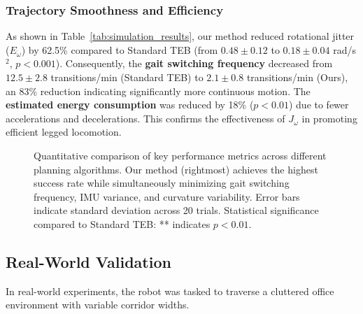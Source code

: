 \documentclass[lettersize,journal]{IEEEtran}
\begin{document}
\subsubsection{Trajectory Smoothness and Efficiency}
As shown in Table~\ref{tab:simulation_results}, our method reduced rotational jitter ($E_{\dot{\omega}}$) by 62.5\% compared to Standard TEB (from $0.48 \pm 0.12$ to $0.18 \pm 0.04$ rad/s$^2$, $p < 0.001$). Consequently, the \textbf{gait switching frequency} decreased from $12.5 \pm 2.8$ transitions/min (Standard TEB) to $2.1 \pm 0.8$ transitions/min (Ours), an 83\% reduction indicating significantly more continuous motion. The \textbf{estimated energy consumption} was reduced by 18\% ($p < 0.01$) due to fewer accelerations and decelerations. This confirms the effectiveness of $J_{\dot{\omega}}$ in promoting efficient legged locomotion.

\begin{figure}[!t]
\centering
\caption{Quantitative comparison of key performance metrics across different planning algorithms. Our method (rightmost) achieves the highest success rate while simultaneously minimizing gait switching frequency, IMU variance, and curvature variability. Error bars indicate standard deviation across 20 trials. Statistical significance compared to Standard TEB: ** indicates $p < 0.01$.}
\label{fig:bar_chart}
\end{figure}

\subsection{Real-World Validation}
In real-world experiments, the robot was tasked to traverse a cluttered office environment with variable corridor widths.
\end{document}
